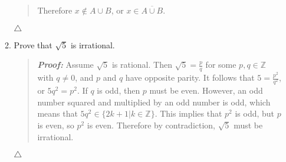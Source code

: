 \documentclass{article}
\newcommand{\Proof}{\textit{\textbf{Proof: }}}
\newcommand{\ZZ}{\mathbb{Z}}
\begin{document}
\begin{enumerate}
\begin{enumerate}
\begin{quote}
Therefore $x \notin A \cup B$, or $x \in \overline{A \cup B}$.
\end{quote}
$\triangle$
\item Prove that $\sqrt{5}$ is irrational.
\begin{quote}
\Proof Assume $\sqrt{5}$ is rational.
Then $\sqrt{5} = \frac{p}{q}$ for some $p,q \in \ZZ$ with $q \neq 0$, and $p$ and $q$ have opposite parity.
It follows that $5 = \frac{p^{2}}{q^{2}}$, or $5q^{2} = p^{2}$.
If $q$ is odd, then $p$ must be even.
However, an odd number squared and multiplied by an odd number is odd, which means that $5q^{2}\in\{2k+1|k\in\ZZ\}$. 
This implies that $p^{2}$ is odd, but $p$ is even, so $p^{2}$ is even.
Therefore by contradiction, $\sqrt{5}$ must be irrational.
\end{quote}
$\triangle$
\end{enumerate}
\end{enumerate}
\end{document}
